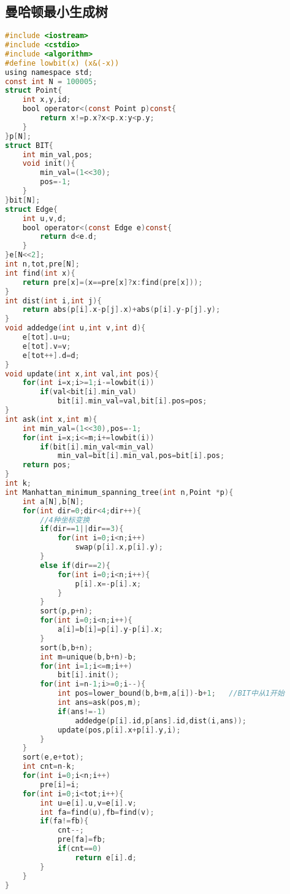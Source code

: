 \subsection{曼哈顿最小生成树}
\begin{lstlisting}[language=C]
#include <iostream>  
#include <cstdio>  
#include <algorithm>  
#define lowbit(x) (x&(-x))  
using namespace std;  
const int N = 100005;  
struct Point{  
    int x,y,id;  
    bool operator<(const Point p)const{  
        return x!=p.x?x<p.x:y<p.y;  
    }  
}p[N];  
struct BIT{  
    int min_val,pos;  
    void init(){  
        min_val=(1<<30);  
        pos=-1;  
    }  
}bit[N];  
struct Edge{  
    int u,v,d;  
    bool operator<(const Edge e)const{  
        return d<e.d;  
    }  
}e[N<<2];  
int n,tot,pre[N];  
int find(int x){  
    return pre[x]=(x==pre[x]?x:find(pre[x]));  
}  
int dist(int i,int j){  
    return abs(p[i].x-p[j].x)+abs(p[i].y-p[j].y);  
}  
void addedge(int u,int v,int d){  
    e[tot].u=u;  
    e[tot].v=v;  
    e[tot++].d=d;  
}  
void update(int x,int val,int pos){  
    for(int i=x;i>=1;i-=lowbit(i))  
        if(val<bit[i].min_val)  
            bit[i].min_val=val,bit[i].pos=pos;  
}  
int ask(int x,int m){  
    int min_val=(1<<30),pos=-1;  
    for(int i=x;i<=m;i+=lowbit(i))  
        if(bit[i].min_val<min_val)  
            min_val=bit[i].min_val,pos=bit[i].pos;  
    return pos;  
}  
int k;  
int Manhattan_minimum_spanning_tree(int n,Point *p){  
    int a[N],b[N];  
    for(int dir=0;dir<4;dir++){  
        //4种坐标变换  
        if(dir==1||dir==3){  
            for(int i=0;i<n;i++)  
                swap(p[i].x,p[i].y);  
        }  
        else if(dir==2){  
            for(int i=0;i<n;i++){  
                p[i].x=-p[i].x;  
            }  
        }  
        sort(p,p+n);  
        for(int i=0;i<n;i++){  
            a[i]=b[i]=p[i].y-p[i].x;  
        }  
        sort(b,b+n);  
        int m=unique(b,b+n)-b;  
        for(int i=1;i<=m;i++)  
            bit[i].init();  
        for(int i=n-1;i>=0;i--){  
            int pos=lower_bound(b,b+m,a[i])-b+1;   //BIT中从1开始  
            int ans=ask(pos,m);  
            if(ans!=-1)  
                addedge(p[i].id,p[ans].id,dist(i,ans));  
            update(pos,p[i].x+p[i].y,i);  
        }  
    }  
    sort(e,e+tot);  
    int cnt=n-k;  
    for(int i=0;i<n;i++)  
        pre[i]=i;  
    for(int i=0;i<tot;i++){  
        int u=e[i].u,v=e[i].v;  
        int fa=find(u),fb=find(v);  
        if(fa!=fb){  
            cnt--;  
            pre[fa]=fb;  
            if(cnt==0)  
                return e[i].d;  
        }  
    }  
}
\end{lstlisting}
